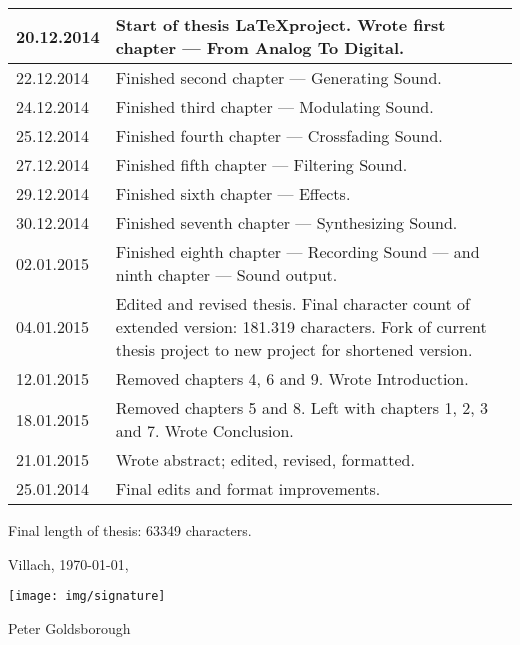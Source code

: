 \begin{tabular}{| p{2cm} | p{13cm} |}
  \hline
  20.12.2014 & Start of thesis \LaTeX project. Wrote first chapter --- From Analog To Digital. \\
  \hline
  22.12.2014 & Finished second chapter --- Generating Sound. \\
  \hline
  24.12.2014 & Finished third chapter --- Modulating Sound. \\
  \hline
  25.12.2014 & Finished fourth chapter --- Crossfading Sound. \\
  \hline
  27.12.2014 & Finished fifth chapter --- Filtering Sound. \\
  \hline
  29.12.2014 & Finished sixth chapter --- Effects. \\
  \hline
  30.12.2014 & Finished seventh chapter --- Synthesizing Sound. \\
  \hline
  02.01.2015 & Finished eighth chapter --- Recording Sound --- and ninth chapter --- Sound output. \\
  \hline
  04.01.2015 & Edited and revised thesis. Final character count of extended version: 181.319 characters. Fork of current thesis project to new project for shortened version. \\
  \hline
  12.01.2015 & Removed chapters 4, 6 and 9. Wrote Introduction. \\
  \hline
  18.01.2015 & Removed chapters 5 and 8. Left with chapters 1, 2, 3 and 7. Wrote Conclusion. \\
  \hline
  21.01.2015 & Wrote abstract; edited, revised, formatted. \\
  \hline
  25.01.2014 & Final edits and format improvements. \\
  \hline
\end{tabular}

\parbreak

Final length of thesis: 63349 characters. \parbreak

Villach, \today, \parbreak \parbreak

\texttt{[image: img/signature]} \parbreak

Peter Goldsborough
